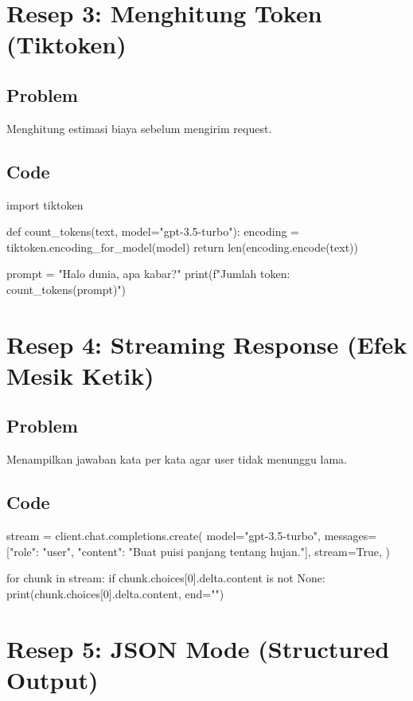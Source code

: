 \section{Resep 3: Menghitung Token (Tiktoken)}

\subsection*{Problem}
Menghitung estimasi biaya sebelum mengirim request.

\subsection*{Code}
\begin{codeblock}[language=Python]
import tiktoken

def count_tokens(text, model="gpt-3.5-turbo"):
    encoding = tiktoken.encoding_for_model(model)
    return len(encoding.encode(text))

prompt = "Halo dunia, apa kabar?"
print(f"Jumlah token: {count_tokens(prompt)}")
\end{codeblock}

\section{Resep 4: Streaming Response (Efek Mesik Ketik)}

\subsection*{Problem}
Menampilkan jawaban kata per kata agar user tidak menunggu lama.

\subsection*{Code}
\begin{codeblock}[language=Python]
stream = client.chat.completions.create(
    model="gpt-3.5-turbo",
    messages=[{"role": "user", "content": "Buat puisi panjang tentang hujan."}],
    stream=True,
)

for chunk in stream:
    if chunk.choices[0].delta.content is not None:
        print(chunk.choices[0].delta.content, end="")
\end{codeblock}

\section{Resep 5: JSON Mode (Structured Output)}


